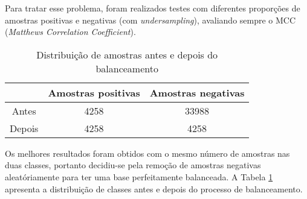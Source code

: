 Para tratar esse problema, foram realizados testes com diferentes proporções de amostras positivas e negativas (com \emph{undersampling}), avaliando sempre o MCC (\emph{Matthews Correlation Coefficient}). 

\begin{table}[ht]
	\centering
  \begin{tabular}{ | c | c | c |}
    \hline
     & Amostras positivas & Amostras negativas \\ \hline
    Antes & 4258 & 33988 \\ \hline
    Depois & 4258 & 4258 \\
    \hline
  \end{tabular}
  \caption{Distribuição de amostras antes e depois do balanceamento}
  \label{tab:tabela_amostra}
\end{table}

Os melhores resultados foram obtidos com o mesmo número de amostras nas duas classes, portanto decidiu-se pela remoção de amostras negativas aleatóriamente para ter uma base perfeitamente balanceada. A Tabela \ref{tab:tabela_amostra} apresenta a distribuição de classes antes e depois do processo de balanceamento.
   